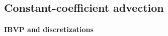 \documentclass[pdflatex,sn-mathphys-num]{sn-jnl}%
\theoremstyle{thmstyleone}%
\theoremstyle{thmstyletwo}%
\theoremstyle{thmstylethree}%
\newcommand{\mat}[1]{\ensuremath{\mathsf{#1}}}
\newcommand{\fnc}[1]{\ensuremath{\mathcal{#1}}}
\begin{document}



\subsection{Constant-coefficient advection}

\paragraph{IBVP and discretizations}
\end{document}

